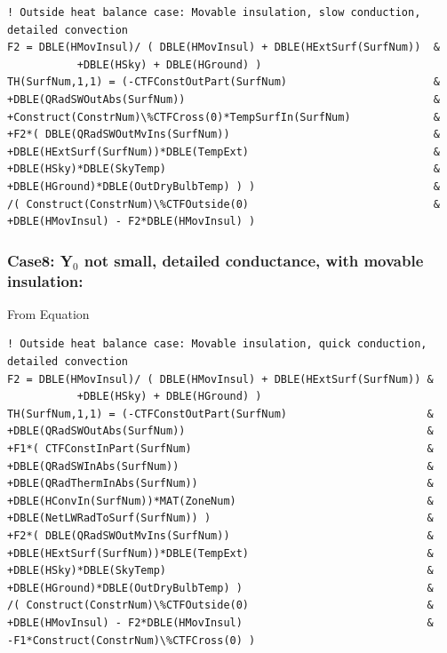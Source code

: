 \begin{lstlisting}
! Outside heat balance case: Movable insulation, slow conduction, detailed convection
F2 = DBLE(HMovInsul)/ ( DBLE(HMovInsul) + DBLE(HExtSurf(SurfNum))  &
           +DBLE(HSky) + DBLE(HGround) )
TH(SurfNum,1,1) = (-CTFConstOutPart(SurfNum)                       &
+DBLE(QRadSWOutAbs(SurfNum))                                       &
+Construct(ConstrNum)\%CTFCross(0)*TempSurfIn(SurfNum)             &
+F2*( DBLE(QRadSWOutMvIns(SurfNum))                                &
+DBLE(HExtSurf(SurfNum))*DBLE(TempExt)                             &
+DBLE(HSky)*DBLE(SkyTemp)                                          &
+DBLE(HGround)*DBLE(OutDryBulbTemp) ) )                            &
/( Construct(ConstrNum)\%CTFOutside(0)                             &
+DBLE(HMovInsul) - F2*DBLE(HMovInsul) )
\end{lstlisting}

\subsubsection{Case8: Y\(_{0}\) not small, detailed conductance, with movable insulation:}\label{case8-yux5f0-not-small-detailed-conductance-with-movable-insulation-1}

From Equation

\begin{lstlisting}
! Outside heat balance case: Movable insulation, quick conduction, detailed convection
F2 = DBLE(HMovInsul)/ ( DBLE(HMovInsul) + DBLE(HExtSurf(SurfNum)) &
           +DBLE(HSky) + DBLE(HGround) )
TH(SurfNum,1,1) = (-CTFConstOutPart(SurfNum)                      &
+DBLE(QRadSWOutAbs(SurfNum))                                      &
+F1*( CTFConstInPart(SurfNum)                                     &
+DBLE(QRadSWInAbs(SurfNum))                                       &
+DBLE(QRadThermInAbs(SurfNum))                                    &
+DBLE(HConvIn(SurfNum))*MAT(ZoneNum)                              &
+DBLE(NetLWRadToSurf(SurfNum)) )                                  &
+F2*( DBLE(QRadSWOutMvIns(SurfNum))                               &
+DBLE(HExtSurf(SurfNum))*DBLE(TempExt)                            &
+DBLE(HSky)*DBLE(SkyTemp)                                         &
+DBLE(HGround)*DBLE(OutDryBulbTemp) )                             &
/( Construct(ConstrNum)\%CTFOutside(0)                            &
+DBLE(HMovInsul) - F2*DBLE(HMovInsul)                             &
-F1*Construct(ConstrNum)\%CTFCross(0) )
\end{lstlisting}


